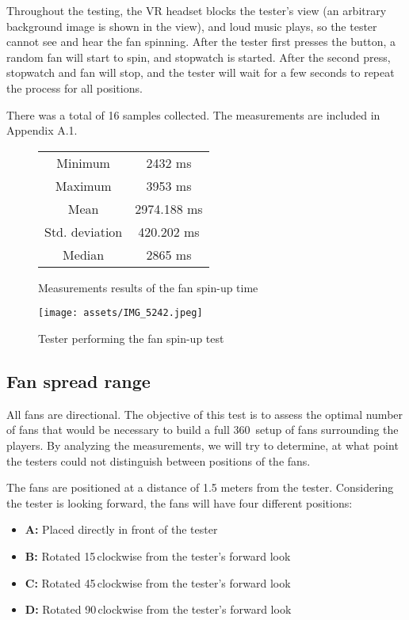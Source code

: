 Throughout the testing, the VR headset blocks the tester’s view (an arbitrary
background image is shown in the view), and loud music plays, so the tester
cannot see and hear the fan spinning. After the tester first presses the button,
a random fan will start to spin, and stopwatch is started. After the second
press, stopwatch and fan will stop, and the tester will wait for a few seconds
to repeat the process for all positions.

There was a total of 16 samples collected. The measurements are included 
in Appendix A.1.

\begin{figure}
\begin{center}
\begin{tabular}{|c|c|}
\hline
Minimum & 2432 ms \\ 
Maximum & 3953 ms \\ 
Mean & 2974.188 ms \\ 
Std. deviation & 420.202 ms \\ 
Median & 2865 ms \\ 
\hline
\end{tabular}
\caption{Measurements results of the fan spin-up time}
\end{center}
\end{figure}

\begin{figure}[h]{}
\centering\texttt{[image: assets/IMG\_5242.jpeg]}
\caption{Tester performing the fan spin-up test}
\end{figure}

\hypertarget{x-fan-spread-range}{\subsection{Fan spread range}}
All fans are directional. The objective of this test is to assess
the optimal number of fans that would be necessary to build a full 360\degree\,
setup of fans surrounding the players. By analyzing the measurements,
we will try to determine, at what point the testers could not distinguish
between positions of the fans.


The fans are positioned at a distance of 1.5 meters from the tester.
Considering the tester is looking forward, the fans will
have four different positions:


\begin{itemize}

\item \textbf{A:} Placed directly in front of the tester

\item \textbf{B:} Rotated 15\degree\,clockwise from the tester’s forward look

\item \textbf{C:} Rotated 45\degree\,clockwise from the tester’s forward look

\item \textbf{D:} Rotated 90\degree\,clockwise from the tester’s forward look

\end{itemize}


